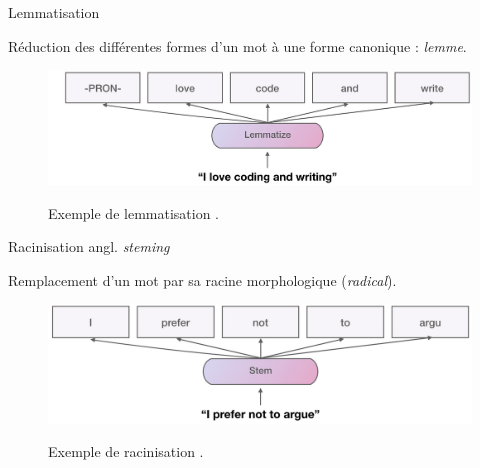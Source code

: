 \documentclass[xetex,xcolor={table,usenames,dvipsnames}]{beamer}
\begin{document}
\begin{frame}{Lemmatisation}
\begin{block}{\vspace{-6mm}}
	\justifying
	Réduction des différentes formes d’un mot à une forme canonique : \textit{lemme}.
\end{block}
	\begin{figure}[h] %
	\centering
	\includegraphics[width=\linewidth]{img/lemmatisation.png}
	\label{fig:evolution}
	\caption{Exemple de lemmatisation \citep{saravia}.}
\end{figure}
\end{frame}

\begin{frame}{Racinisation}
	{\scriptsize angl. \textit{steming}}
	\begin{block}{\vspace{-6mm}}
		\justifying
	Remplacement d'un mot par sa racine morphologique (\textit{radical}).
	\end{block}
		\begin{figure}[h] %
		\centering
		\includegraphics[width=\linewidth]{img/racinisation.png}
		\label{fig:racinisation}
		\caption{Exemple de racinisation \citep{saravia}.}
	\end{figure}
\end{frame}
\end{document}
